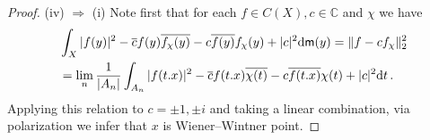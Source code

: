\documentclass[10pt,a4paper]{amsart}
\newcommand{\CC}{{\mathbb C}}
\newcommand{\dd}{\mbox{\rm d}}
\newcommand{\mm}{\mathsf{m}}
\begin{document}
\begin{proof}
\medskip (iv) $\Longrightarrow$ (i)
Note first that for each $f \in C(X), c \in \CC$ and $\chi$ we have
\begin{align*}
&\int_{X} |f(y)|^2   -   \overline{c} f(y) \overline{f_\chi(y)} - c \overline{f(y)} f_\chi(y) +|c|^2 \dd \mm(y) =\| f-  c f_{\chi} \|^2_2\\
&= \lim_n  \frac{1}{|A_n|} \int_{A_n} |f(t.x)|^2 -\overline{c} f(t.x)\overline{\chi(t)} - c \overline{f(t.x)} \chi(t) + |c|^2 \dd t \,.
\end{align*}
Applying this relation to $c=\pm 1, \pm i$ and taking a linear combination, via polarization we infer that $x$ is Wiener--Wintner point.
\end{proof}
\end{document}
